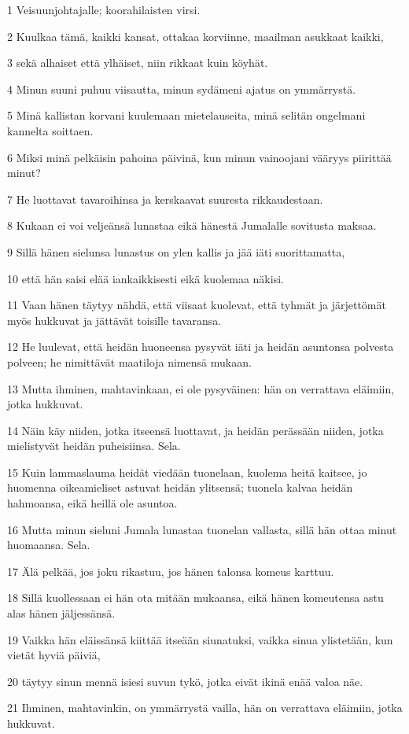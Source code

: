 \par 1 Veisuunjohtajalle; koorahilaisten virsi.
\par 2 Kuulkaa tämä, kaikki kansat, ottakaa korviinne, maailman asukkaat kaikki,
\par 3 sekä alhaiset että ylhäiset, niin rikkaat kuin köyhät.
\par 4 Minun suuni puhuu viisautta, minun sydämeni ajatus on ymmärrystä.
\par 5 Minä kallistan korvani kuulemaan mietelauseita, minä selitän ongelmani kannelta soittaen.
\par 6 Miksi minä pelkäisin pahoina päivinä, kun minun vainoojani vääryys piirittää minut?
\par 7 He luottavat tavaroihinsa ja kerskaavat suuresta rikkaudestaan.
\par 8 Kukaan ei voi veljeänsä lunastaa eikä hänestä Jumalalle sovitusta maksaa.
\par 9 Sillä hänen sielunsa lunastus on ylen kallis ja jää iäti suorittamatta,
\par 10 että hän saisi elää iankaikkisesti eikä kuolemaa näkisi.
\par 11 Vaan hänen täytyy nähdä, että viisaat kuolevat, että tyhmät ja järjettömät myös hukkuvat ja jättävät toisille tavaransa.
\par 12 He luulevat, että heidän huoneensa pysyvät iäti ja heidän asuntonsa polvesta polveen; he nimittävät maatiloja nimensä mukaan.
\par 13 Mutta ihminen, mahtavinkaan, ei ole pysyväinen: hän on verrattava eläimiin, jotka hukkuvat.
\par 14 Näin käy niiden, jotka itseensä luottavat, ja heidän perässään niiden, jotka mielistyvät heidän puheisiinsa. Sela.
\par 15 Kuin lammaslauma heidät viedään tuonelaan, kuolema heitä kaitsee, jo huomenna oikeamieliset astuvat heidän ylitsensä; tuonela kalvaa heidän hahmoansa, eikä heillä ole asuntoa.
\par 16 Mutta minun sieluni Jumala lunastaa tuonelan vallasta, sillä hän ottaa minut huomaansa. Sela.
\par 17 Älä pelkää, jos joku rikastuu, jos hänen talonsa komeus karttuu.
\par 18 Sillä kuollessaan ei hän ota mitään mukaansa, eikä hänen komeutensa astu alas hänen jäljessänsä.
\par 19 Vaikka hän eläissänsä kiittää itseään siunatuksi, vaikka sinua ylistetään, kun vietät hyviä päiviä,
\par 20 täytyy sinun mennä isiesi suvun tykö, jotka eivät ikinä enää valoa näe.
\par 21 Ihminen, mahtavinkin, on ymmärrystä vailla, hän on verrattava eläimiin, jotka hukkuvat.

